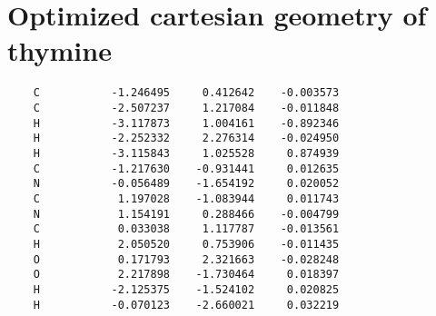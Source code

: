 \documentclass[12pt]{article}
\begin{document}
\section{Optimized cartesian geometry of thymine}
{\small
\begin{verbatim}
    C           -1.246495     0.412642    -0.003573 
    C           -2.507237     1.217084    -0.011848 
    H           -3.117873     1.004161    -0.892346 
    H           -2.252332     2.276314    -0.024950 
    H           -3.115843     1.025528     0.874939 
    C           -1.217630    -0.931441     0.012635 
    N           -0.056489    -1.654192     0.020052 
    C            1.197028    -1.083944     0.011743 
    N            1.154191     0.288466    -0.004799
    C            0.033038     1.117787    -0.013561 
    H            2.050520     0.753906    -0.011435 
    O            0.171793     2.321663    -0.028248 
    O            2.217898    -1.730464     0.018397 
    H           -2.125375    -1.524102     0.020825 
    H           -0.070123    -2.660021     0.032219 
\end{verbatim}}
\newpage
\end{document}
